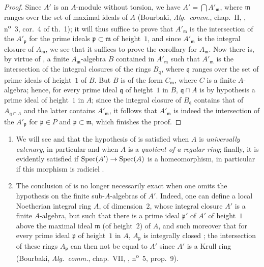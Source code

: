 \begin{proof}
Since $A'$ is an $A$-module without torsion, we have $A'=\bigcap A'_\mathfrak{m}$, where $\mathfrak{m}$ ranges over the set of maximal ideals of $A$ (Bourbaki, \emph{Alg.~comm.}, chap.~II, , n\textsuperscript{o}~3, cor.~4 of th.~1);
it will thus suffice to prove that $A'_\mathfrak{m}$ is the intersection of the $A'_\mathfrak{p}$ for the prime ideals $\mathfrak{p}\subset\mathfrak{m}$ of height~$1$, and since $A'_\mathfrak{m}$ is the integral closure of $A_\mathfrak{m}$, we see that it suffices to prove the corollary for $A_\mathfrak{m}$.
Now there is, by virtue of , a finite $A_\mathfrak{m}$-algebra $B$ contained in $A'_\mathfrak{m}$ such that $A'_\mathfrak{m}$ is the intersection of the integral closures of the rings $B_\mathfrak{q}$, where $\mathfrak{q}$ ranges over the set of prime ideals of height~$1$ of $B$.
But $B$ is of the form $C_\mathfrak{m}$, where $C$ is a finite $A$-algebra; hence, for every prime ideal $\mathfrak{q}$ of height~$1$ in $B$, $\mathfrak{q}\cap A$ is by hypothesis a prime ideal of height~$1$ in $A$; since the integral closure of $B_\mathfrak{q}$ contains that of $A_{\mathfrak{q}\cap A}$ and the latter contains $A'_\mathfrak{m}$, it follows that $A'_\mathfrak{m}$ is indeed the intersection of the $A'_\mathfrak{p}$ for $\mathfrak{p}\in P$ and $\mathfrak{p}\subset\mathfrak{m}$, which finishes the proof.
\end{proof}

\begin{remarks}[23.2.10]
\label{0.23.2.10}
\medskip\noindent
\begin{enumerate}
  \item[{\rm(i)}] We will see  and  that the hypothesis of  is satisfied when $A$ is \emph{universally catenary}, in particular  and  when $A$ is a \emph{quotient of a regular ring}; finally, it is evidently satisfied if $\operatorname{Spec}(A')\to\operatorname{Spec}(A)$ is a homeomorphism, in particular if this morphism is radiciel .
  \item[{\rm(ii)}] The conclusion of  is no longer necessarily exact when one omits the hypothesis on the finite sub-$A$-algebras of $A'$.
    Indeed, one can define a local Noetherian integral ring $A$, of dimension~$2$, whose integral closure $A'$ is a finite $A$-algebra, but such that there is a prime ideal $\mathfrak{p}'$ of $A'$ of height~$1$ above the maximal ideal $\mathfrak{m}$ (of height~$2$) of $A$, and such moreover that for every prime ideal $\mathfrak{p}$ of height~$1$ in $A$, $A_\mathfrak{p}$ is integrally closed ; the intersection of these rings $A_\mathfrak{p}$ can then not be equal to $A'$ since $A'$ is a Krull ring (Bourbaki, \emph{Alg.~comm.}, chap.~VII, , n\textsuperscript{o}~5, prop.~9).
\end{enumerate}
\end{remarks}
